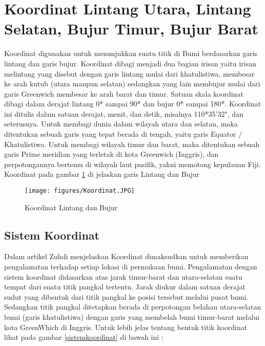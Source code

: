

\section{Koordinat Lintang Utara, Lintang Selatan, Bujur Timur, Bujur Barat}
Koordinat digunakan untuk menunjukkan suatu titik di Bumi berdasarkan garis lintang dan garis bujur. Koordinat dibagi menjadi dua bagian irisan yaitu irisan melintang yang disebut dengan garis lintang mulai dari khatulistiwa, membesar ke arah kutub (utara maupun selatan) sedangkan yang lain membujur mulai dari garis Greenwich membesar ke arah barat dan timur. Satuan skala koordinat dibagi dalam derajat lintang 0* sampai 90* dan bujur 0* sampai 180*. Koordinat ini ditulis dalam satuan derajat, menit, dan detik, misalnya 110*35'32", dan seterusnya. Untuk membagi dunia dalam wilayah utara dan selatan, maka ditentukan sebuah garis yang tepat berada di tengah, yaitu garis Equator / Khatulistiwa. Untuk membagi wilayah timur dan barat, maka ditentukan sebuah garis Prime meridian yang terletak di kota Greenwich (Inggris), dan perpotongannya bertemu di wilayah laut pasifik, yakni memotong kepulauan Fiji.
Koordinat pada gambar \ref{Koordinat} di jelaskan garis Lintang dan Bujur
\begin{figure}[ht]
	\centerline{\texttt{[image: figures/Koordinat.JPG]}}
	\caption{Koordinat Lintang dan Bujur}
	\label{Koordinat}
	\end{figure}

\subsection{Sistem Koordinat}

Dalam artikel Zuhdi menjelaskan Koordinat dimaksudkan untuk memberikan pengalamatan terhadap setiap lokasi di permukaan bumi. Pengalamatan dengan sistem koordinat didasarkan atas jarak timur-barat dan utara-selatan suatu tempat dari suatu titik pangkal tertentu. Jarak diukur dalam satuan derajat sudut yang dibentuk dari titik pangkal ke posisi tersebut melalui pusat bumi. Sedangkan titik pangkal ditetapkan berada di perpotongan belahan utara-selatan bumi (garis khatulistiwa) dengan garis yang membelah bumi timur-barat melalui kota GreenWhich di Inggris. 
Untuk lebih jelas tentang bentuk titik koordinat lihat pada gambar \ref{sistemkoordinat} di bawah ini :

